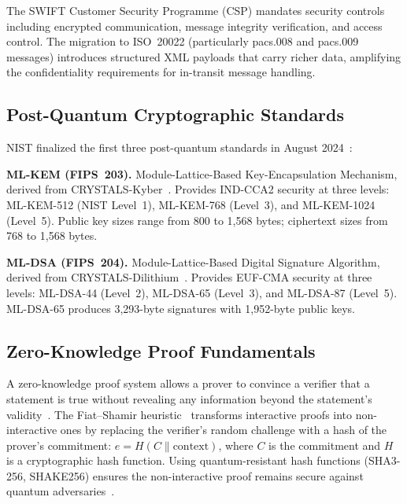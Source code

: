 \documentclass[conference,10pt]{IEEEtran}
\begin{document}
The SWIFT Customer Security Programme (CSP) mandates security controls including encrypted communication, message integrity verification, and access control. The migration to ISO~20022 (particularly pacs.008 and pacs.009 messages) introduces structured XML payloads that carry richer data, amplifying the confidentiality requirements for in-transit message handling.

\subsection{Post-Quantum Cryptographic Standards}

NIST finalized the first three post-quantum standards in August 2024~\cite{nist2024fips203,nist2024fips204}:

\textbf{ML-KEM (FIPS~203).} Module-Lattice-Based Key-Encapsulation Mechanism, derived from CRYSTALS-Kyber~\cite{bos2018crystals}. Provides IND-CCA2 security at three levels: ML-KEM-512 (NIST Level~1), ML-KEM-768 (Level~3), and ML-KEM-1024 (Level~5). Public key sizes range from 800 to 1,568 bytes; ciphertext sizes from 768 to 1,568 bytes.

\textbf{ML-DSA (FIPS~204).} Module-Lattice-Based Digital Signature Algorithm, derived from CRYSTALS-Dilithium~\cite{ducas2018crystals}. Provides EUF-CMA security at three levels: ML-DSA-44 (Level~2), ML-DSA-65 (Level~3), and ML-DSA-87 (Level~5). ML-DSA-65 produces 3,293-byte signatures with 1,952-byte public keys.

\subsection{Zero-Knowledge Proof Fundamentals}

A zero-knowledge proof system allows a prover to convince a verifier that a statement is true without revealing any information beyond the statement's validity~\cite{goldwasser1989knowledge}. The Fiat--Shamir heuristic~\cite{fiatShamir1986} transforms interactive proofs into non-interactive ones by replacing the verifier's random challenge with a hash of the prover's commitment: $e = H(C \| \text{context})$, where $C$ is the commitment and $H$ is a cryptographic hash function. Using quantum-resistant hash functions (SHA3-256, SHAKE256) ensures the non-interactive proof remains secure against quantum adversaries~\cite{chen2016nist}.

\end{document}
